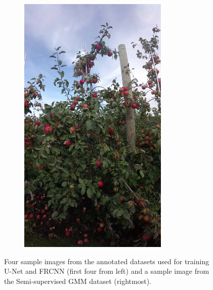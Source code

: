 \begin{figure}[!htb]
\begin{subfigure}[b]{0.18\textwidth}
    \includegraphics[width=\textwidth]{figures/detection/dataset20151.jpg}%
    \end{subfigure}
    \caption[Sample images from the training datasets for detection.]{Four sample images from the annotated datasets used for training U-Net and FRCNN (first four from left) and a sample image from the Semi-supervised GMM dataset (rightmost). }
    \label{fig:trainingsets}
\end{figure}

